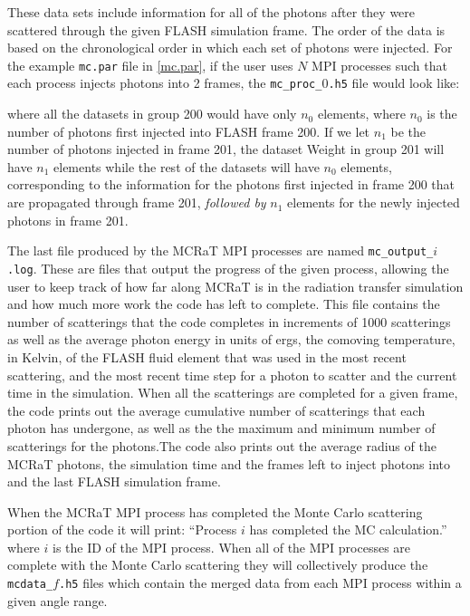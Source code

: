 \documentclass[12pt,a4paper]{article}
\begin{document}
These data sets include information for all of the photons after they were scattered through the given FLASH simulation frame. The order of the data is based on the chronological order in which each set of photons were injected. For the example \texttt{mc.par} file in \autoref{mc.par}, if the user uses $N$ MPI processes such that each process injects photons into 2 frames, the \texttt{mc\_proc\_$0$.h5} file would look like:
\begin{figure}[h!]
 \end{figure}
 
where all the datasets in group 200 would have only $n_{0}$ elements, where $n_{0}$ is the number of photons first injected into FLASH frame 200. If we let $n_{1}$ be the number of photons injected in frame 201, the dataset Weight in group 201 will have $n_{1}$ elements while the rest of the datasets will have $n_{0}$ elements, corresponding to the information for the photons first injected in frame 200 that are propagated through frame 201, \textit{followed by} $n_{1}$ elements for the newly injected photons in frame 201. 

The last file produced by the MCRaT MPI processes are named \texttt{mc\_output\_$i$.log}. These are files that output the progress of the given process, allowing the user to keep track of how far along MCRaT is in the radiation transfer simulation and how much more work the code has left to complete. This file contains the number of scatterings that the code completes in increments of 1000 scatterings as well as the average photon energy in units of ergs, the comoving temperature, in Kelvin, of the FLASH fluid element that was used in the most recent scattering, and the most recent time step for a photon to scatter and the current time in the simulation. When all the scatterings are completed for a given frame, the code prints out the average cumulative number of scatterings that each photon has undergone, as well as the the maximum and minimum number of scatterings for the photons.The code also prints out the average radius of the MCRaT photons, the simulation time and the frames left to inject photons into and the last FLASH simulation frame.

When the MCRaT MPI process has completed the Monte Carlo scattering portion of the code it will print: ``Process $i$ has completed the MC calculation.'' where $i$ is the ID of the MPI process. When all of the MPI processes are complete with the Monte Carlo scattering they will collectively produce the \texttt{mcdata\_$f$.h5} files which contain the merged data from each MPI process within a given angle range.
\end{document}
